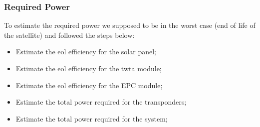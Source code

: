 \subsubsection{Required Power}
	To estimate the required power we supposed to be in the worst case (end of life of the satellite) and followed the steps below:
\begin{itemize}
\item Estimate the \gls{eol} efficiency for the solar panel;
\item Estimate the \gls{eol} efficiency for the \gls{twta} module;
\item Estimate the \gls{eol} efficiency for the EPC module;
\item Estimate the total power required for the transponders;
\item Estimate the total power required for the system;
\end{itemize}
